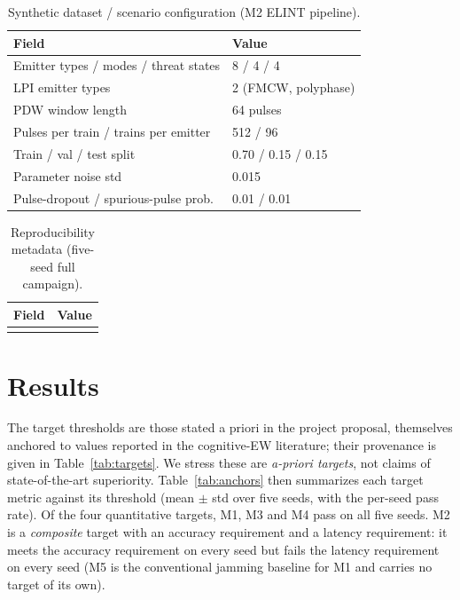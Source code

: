 \documentclass[journal]{IEEEtran}
\begin{document}
\begin{table}[t]
\caption{Synthetic dataset / scenario configuration (M2 ELINT pipeline).}
\label{tab:data}
\centering
\footnotesize
\begin{tabular}{@{}ll@{}}
\toprule
Field & Value \\
\midrule
Emitter types / modes / threat states & 8 / 4 / 4 \\
LPI emitter types & 2 (FMCW, polyphase) \\
PDW window length & 64 pulses \\
Pulses per train / trains per emitter & 512 / 96 \\
Train / val / test split & 0.70 / 0.15 / 0.15 \\
Parameter noise std & 0.015 \\
Pulse-dropout / spurious-pulse prob. & 0.01 / 0.01 \\
\bottomrule
\end{tabular}
\end{table}

\begin{table}[t]
\caption{Reproducibility metadata (five-seed full campaign).}
\label{tab:repro}
\centering
\footnotesize
\begin{tabular}{@{}ll@{}}
\toprule
Field & Value \\
\midrule
\\
\bottomrule
\end{tabular}
\end{table}

\section{Results}
\label{sec:results}
The target thresholds are those stated a priori in the project proposal, themselves anchored to
values reported in the cognitive-EW literature; their provenance is given in
Table~\ref{tab:targets}. We stress these are \emph{a-priori targets}, not claims of
state-of-the-art superiority. Table~\ref{tab:anchors} then summarizes each target metric against
its threshold (mean $\pm$ std over five seeds, with the per-seed pass rate). Of the four
quantitative targets, M1, M3 and M4 pass on all five seeds. M2 is a \emph{composite} target with
an accuracy requirement and a latency requirement: it meets the accuracy requirement on every
seed but fails the latency requirement on every seed (M5 is the conventional jamming baseline for
M1 and carries no target of its own).
\end{document}
